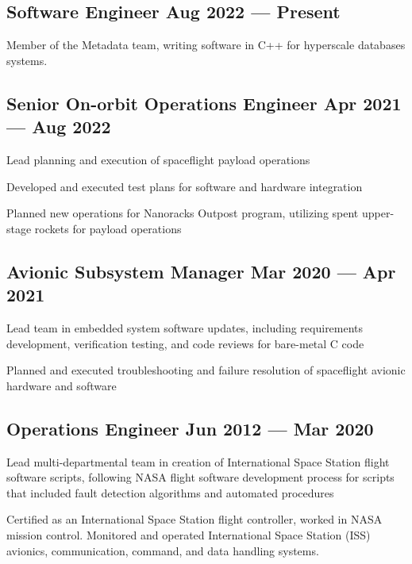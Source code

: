 \documentclass[letter,10pt]{article}
\begin{document}
\subsection{{Software Engineer \hfill Aug 2022 --- Present}}
\begin{zitemize}
\item Member of the Metadata team, writing software in C++ for hyperscale databases systems.
\end{zitemize}

\subsection{{Senior On-orbit Operations Engineer \hfill Apr 2021 --- Aug 2022}}
\begin{zitemize}
\item Lead planning and execution of spaceflight payload operations
\item Developed and executed test plans for software and hardware integration
\item Planned new operations for Nanoracks Outpost program, utilizing spent upper-stage rockets for payload operations
\end{zitemize}

\subsection{{Avionic Subsystem Manager \hfill Mar 2020 --- Apr 2021}}
\begin{zitemize}
\item Lead team in embedded system software updates, including requirements development, verification testing, and code reviews for bare-metal C code
\item Planned and executed troubleshooting and failure resolution of spaceflight avionic hardware and software
\end{zitemize}

\subsection{{Operations Engineer \hfill Jun 2012 --- Mar 2020}}
\begin{zitemize}
\item Lead multi-departmental team in creation of International Space Station flight software scripts, following NASA flight software development process for scripts that included fault detection algorithms and automated procedures
\item Certified as an International Space Station flight controller, worked in NASA mission control.
Monitored and operated International Space Station (ISS) avionics, communication, command, and
data handling systems.
\end{zitemize}
\end{document}
